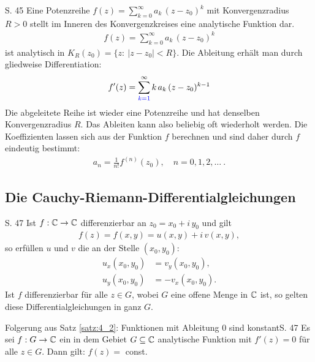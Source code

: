 \begin{satz}{S. 45}
  Eine Potenzreihe $\displaystyle f(z) = \sum_{k=0}^\infty a_k \, (z - z_0)^k$ mit Konvergenzradius $R > 0$ stellt im Inneren des Konvergenzkreises eine analytische Funktion dar.
  \begin{align}
    f(z) = \sum_{k=0}^\infty a_k \, (z - z_0)^k
  \end{align}
  ist analytisch in $K_R (z_0) = \{ z: \ |z - z_0| < R \}$.
  Die Ableitung erhält man durch gliedweise Differentiation:
  \begin{align}
    f'(z) = \sum_{\textcolor{blue}{k=1}}^\infty k \, a_k \, (z - z_0)^{k-1}
  \end{align}
  Die abgeleitete Reihe ist wieder eine Potenzreihe und hat denselben Konvergenzradius $R$.
  Das Ableiten kann also beliebig oft wiederholt werden.
  Die Koeffizienten lassen sich aus der Funktion $f$ berechnen und sind daher durch $f$ eindeutig bestimmt:
  \begin{align}
    a_n = \frac{1}{n!} f^{(n)}(z_0), \quad n = 0, 1, 2, \dots\ .
  \end{align}
\end{satz}



\subsection{Die Cauchy-Riemann-Differentialgleichungen}

\begin{satz}{S. 47}
  \label{satz:4_2}
  Ist $f : \mathbb{C} \to \mathbb{C}$ differenzierbar an $z_0 = x_0 + i \, y_0$ und gilt
  \begin{align}
    f(z) = f(x,y) = u(x,y) + i \, v(x, y) ,
  \end{align}
  so erfüllen $u$ und $v$ die  an der Stelle $(x_0, y_0)$:
  \begin{align}
    u_x(x_0, y_0) &=   v_y(x_0, y_0) ,\\
    u_y(x_0, y_0) &= - v_x(x_0, y_0) .
  \end{align}
  Ist $f$ differenzierbar für alle $z \in G$, wobei $G$ eine offene Menge in $\mathbb{C}$ ist, so gelten diese Differentialgleichungen in ganz $G$.
\end{satz}

\begin{bemerkung}{Folgerung aus Satz \ref{satz:4_2}: Funktionen mit Ableitung $0$ sind konstant}{S. 47}
  Es sei $f : G \to \mathbb{C}$ ein in dem Gebiet $G \subseteq \mathbb{C}$ analytische Funktion mit $f'(z) = 0$ für alle $z \in G$.
  Dann gilt: $f(z) =$ const.
\end{bemerkung}



